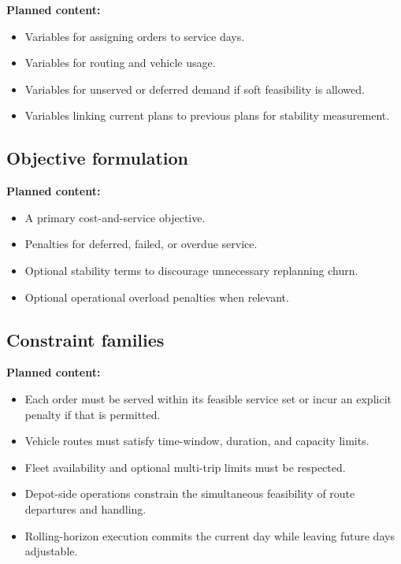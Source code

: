 \noindent\textbf{Planned content:}
\begin{itemize}
    \item Variables for assigning orders to service days.
    \item Variables for routing and vehicle usage.
    \item Variables for unserved or deferred demand if soft feasibility is allowed.
    \item Variables linking current plans to previous plans for stability measurement.
\end{itemize}

\subsection{Objective formulation}
\label{subsec:chapter03_objective_formulation}

%

\noindent\textbf{Planned content:}
\begin{itemize}
    \item A primary cost-and-service objective.
    \item Penalties for deferred, failed, or overdue service.
    \item Optional stability terms to discourage unnecessary replanning churn.
    \item Optional operational overload penalties when relevant.
\end{itemize}

\subsection{Constraint families}
\label{subsec:chapter03_constraint_families}

%

\noindent\textbf{Planned content:}
\begin{itemize}
    \item Each order must be served within its feasible service set or incur an explicit penalty if that is permitted.
    \item Vehicle routes must satisfy time-window, duration, and capacity limits.
    \item Fleet availability and optional multi-trip limits must be respected.
    \item Depot-side operations constrain the simultaneous feasibility of route departures and handling.
    \item Rolling-horizon execution commits the current day while leaving future days adjustable.
\end{itemize}

